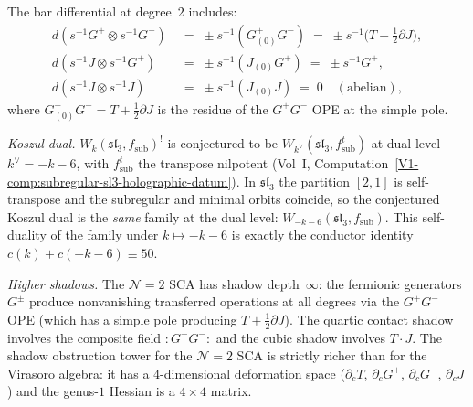 \begin{conjecture}[Ordered bar complex for the
$\mathcal N=2$ superconformal algebra;
\ClaimStatusConjectured]
The bar differential at degree~$2$ includes:
\begin{align*}
d(s^{-1}G^+\otimes s^{-1}G^-)
&\;=\;\pm s^{-1}(G^+_{(0)}G^-)
\;=\;\pm s^{-1}\bigl(T+\tfrac12\partial J\bigr),\\
d(s^{-1}J\otimes s^{-1}G^+)
&\;=\;\pm s^{-1}(J_{(0)}G^+)
\;=\;\pm s^{-1}G^+,\\
d(s^{-1}J\otimes s^{-1}J)
&\;=\;\pm s^{-1}(J_{(0)}J)\;=\;0
\quad(\text{abelian}),
\end{align*}
where $G^+_{(0)}G^-=T+\frac12\partial J$ is the residue of
the $G^+G^-$ OPE at the simple pole.

\emph{Koszul dual.}
$W_k(\mathfrak{sl}_3,f_{\mathrm{sub}})^!$ is conjectured to be
$W_{k^\vee}(\mathfrak{sl}_3,f_{\mathrm{sub}}^t)$
at dual level $k^\vee=-k-6$, with $f_{\mathrm{sub}}^t$ the
transpose nilpotent (Vol~I,
Computation~\ref*{V1-comp:subregular-sl3-holographic-datum}).
In $\mathfrak{sl}_3$ the partition $[2,1]$ is self-transpose and
the subregular and minimal orbits coincide, so the conjectured
Koszul dual is the \emph{same} family at the dual level:
$W_{-k-6}(\mathfrak{sl}_3,f_{\mathrm{sub}})$. This self-duality
of the family under $k\mapsto -k-6$ is exactly the conductor
identity $c(k)+c(-k-6)\equiv 50$.

\emph{Higher shadows.}
The $\mathcal N=2$ SCA has shadow depth~$\infty$:
the fermionic generators $G^\pm$ produce nonvanishing
transferred operations at all degrees via the $G^+G^-$ OPE
(which has a simple pole producing $T+\frac12\partial J$).
The quartic contact shadow involves the composite field
${:}G^+G^-{:}$ and the cubic shadow involves $T\cdot J$.
The shadow obstruction tower for the $\mathcal N=2$ SCA is strictly
richer than for the Virasoro algebra: it has a
$4$-dimensional deformation space
($\partial_c T$, $\partial_c G^+$, $\partial_c G^-$,
$\partial_c J$) and the genus-$1$ Hessian is a
$4\times 4$ matrix.


\end{conjecture}
